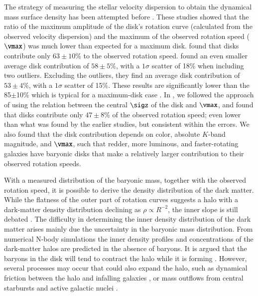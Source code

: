 \documentclass[traditabstract]{aa} %
\begin{document}
The strategy of measuring the stellar velocity dispersion to obtain the dynamical mass 
surface density has been attempted before \citep{kruit1984, kruit1986, bottema1993,
kregel2005}. These studies showed that the ratio of the maximum amplitude of the disk's
rotation curve (calculated from the observed velocity dispersion) and the maximum of the
observed rotation speed ($\vmax$) was much lower than expected for a maximum disk.
\cite{bottema1993} found that disks contribute only $63\pm10$\% to the observed rotation
speed. \cite{kregel2005} found an even smaller average disk contribution of $58\pm5$\%,
with a $1\sigma$ scatter of 18\% when including two outliers. Excluding the outliers, they
find an average disk contribution of $53\pm4$\%, with a $1\sigma$ scatter of 15\%. These
results are significantly lower than the 85$\pm$10\% which is typical for a maximum-disk
case \citep{sackett1997}.
%
In \citet[][hereafter ]{bershady2011}, we followed the approach
of using the relation between the central $\sigz$ of the disk and $\vmax$, and found that
disks contribute only $47\pm8$\% of the observed rotation speed; even lower than what was
found by the earlier studies, but consistent within the errors. 
We also found that the disk contribution depends on color, absolute $K$-band magnitude,
and $\vmax$, such that redder, more luminous, and faster-rotating galaxies have baryonic
disks that make a relatively larger contribution to their observed rotation speeds.

With a measured distribution of the baryonic mass, together with the observed rotation
speed, it is possible to derive the density distribution of the dark matter. While the
flatness of the outer part of rotation curves suggests a halo with a dark-matter density
distribution declining as $\rho \propto R^{-2}$, the inner slope is still debated
\citep[see, e.g.,][]{deBlok2010}. The difficulty in determining the inner density
distribution of the dark matter arises mainly due the uncertainty in the baryonic mass
distribution. From numerical N-body simulations \citep[e.g.,][]{NFW1997} the inner density
profiles and concentrations of the dark-matter halos are predicted in the absence of
baryons. It is argued that the baryons in the disk will tend to contract the halo while it
is forming \citep[e.g.,][]{blumenthal1986, gnedin2004}. However, several processes may
occur that could also expand the halo, such as dynamical friction between the halo and
infalling galaxies \citep[e.g.,][]{el-zant2001}, or mass outflows from central starbursts
and active galactic nuclei \citep{read2005,governato2012,pontzen2012}.
\end{document}
